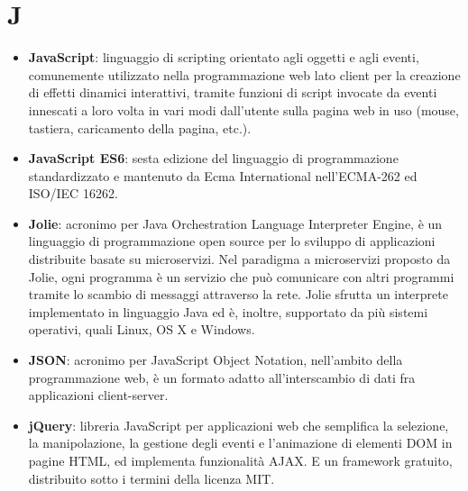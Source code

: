 \section{J}
\begin{itemize} 
	\item \textbf{JavaScript}:  linguaggio di scripting orientato agli oggetti e agli eventi, comunemente utilizzato nella programmazione web lato client per la creazione di effetti dinamici interattivi, tramite funzioni di script invocate da eventi innescati a loro volta in vari modi dall'utente sulla pagina web in uso (mouse, tastiera, caricamento della pagina, etc.). 
	\item \textbf{JavaScript ES6}: sesta edizione del linguaggio di programmazione standardizzato e mantenuto da Ecma International nell'ECMA-262 ed ISO/IEC 16262.
	\item \textbf{Jolie}: acronimo per Java Orchestration Language Interpreter Engine, è un linguaggio di programmazione open source per lo sviluppo di applicazioni distribuite basate su microservizi. Nel paradigma a microservizi proposto da Jolie, ogni programma è un servizio che può comunicare con altri programmi tramite lo scambio di messaggi attraverso la rete. Jolie sfrutta un interprete implementato in linguaggio Java ed è, inoltre, supportato da più sistemi operativi, quali Linux, OS X e Windows.
	\item \textbf{JSON}: acronimo per JavaScript Object Notation, nell'ambito della programmazione web, è un formato adatto all'interscambio di dati fra applicazioni client-server.
	\item \textbf{jQuery}: libreria JavaScript per applicazioni web che semplifica la selezione, la manipolazione, la gestione degli eventi e l'animazione di elementi DOM in pagine HTML, ed implementa funzionalità AJAX. \MakeUppercase{e} un framework gratuito, distribuito sotto i termini della licenza MIT.
\end{itemize}